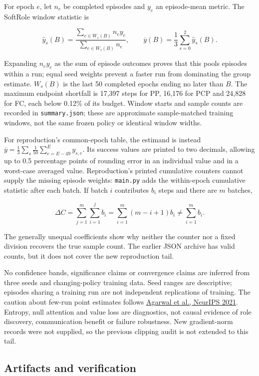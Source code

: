 \documentclass[
  10pt,
]{article}
\begin{document}
For epoch \(e\), let \(n_e\) be completed episodes and \(y_e\) an
episode-mean metric. The SoftRole window statistic is

\[\widehat y_s(B)=\frac{\sum_{e\in W_s(B)}n_e y_e}{\sum_{e\in W_s(B)}n_e},
\qquad \overline y(B)=\frac13\sum_{s=0}^{2}\widehat y_s(B).\]

Expanding \(n_e y_e\) as the sum of episode outcomes proves that this
pools episodes within a run; equal seed weights prevent a faster run
from dominating the group estimate. \(W_s(B)\) is the last 50 completed
epochs ending no later than \(B\). The maximum endpoint shortfall is
17,397 steps for PP, 16,176 for PCP and 24,828 for FC, each below 0.12\%
of its budget. Window starts and sample counts are recorded in
\texttt{summary.json}; these are approximate sample-matched training
windows, not the same frozen policy or identical window widths.

For reproduction's common-epoch table, the estimand is instead
\(\overline y=\frac13\sum_s\frac1{50}\sum_{e=E-49}^{E}y_{s,e}\). Its
success values are printed to two decimals, allowing up to 0.5
percentage points of rounding error in an individual value and in a
worst-case averaged value. Reproduction's printed cumulative counters
cannot supply the missing episode weights: \texttt{main.py} adds the
within-epoch cumulative statistic after each batch. If batch \(i\)
contributes \(b_i\) steps and there are \(m\) batches,

\[\Delta C=\sum_{j=1}^{m}\sum_{i=1}^{j}b_i
=\sum_{i=1}^{m}(m-i+1)b_i\ne\sum_{i=1}^{m}b_i.\]

The generally unequal coefficients show why neither the counter nor a
fixed division recovers the true sample count. The earlier JSON archive
has valid counts, but it does not cover the new reproduction tail.

No confidence bands, significance claims or convergence claims are
inferred from three seeds and changing-policy training data. Seed ranges
are descriptive; episodes sharing a training run are not independent
replications of training. The caution about few-run point estimates
follows \href{https://arxiv.org/abs/2108.13264}{Agarwal et al., NeurIPS
2021}. Entropy, null attention and value loss are diagnostics, not
causal evidence of role discovery, communication benefit or failure
robustness. New gradient-norm records were not supplied, so the previous
clipping audit is not extended to this tail.

\subsection{Artifacts and
verification}\label{artifacts-and-verification}
\end{document}
